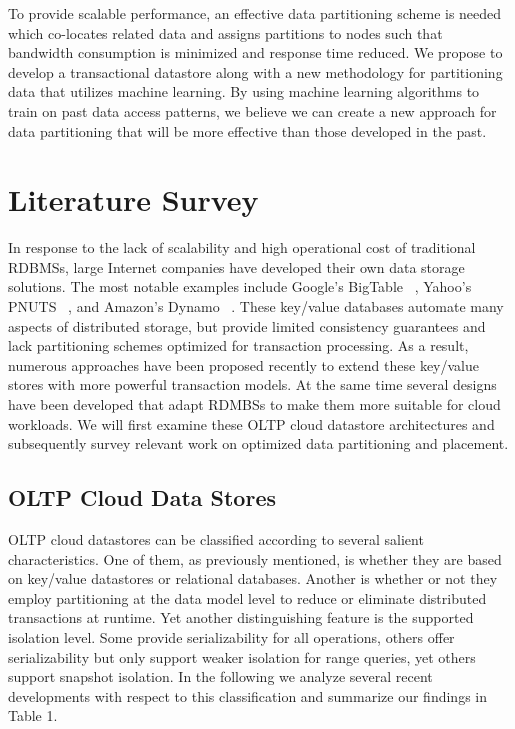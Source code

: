 \documentclass[10pt,final,journal]{IEEEtran}
\begin{document}
To provide scalable performance, an effective data partitioning scheme is needed which co-locates related data and assigns partitions to nodes such that bandwidth consumption is minimized and response time reduced. We propose to develop a transactional datastore along with a new methodology for partitioning data that utilizes machine learning. By using machine learning algorithms to train on past data access patterns, we believe we can create a new approach for data partitioning that will be more effective than those developed in the past.

\section{Literature Survey}
In response to the lack of scalability and high operational cost of traditional RDBMSs, large Internet companies have developed their own data storage solutions. The most notable examples include Google's BigTable ~\cite{Chang:2006:BDS:1267308.1267323}, Yahoo's PNUTS ~\cite{Cooper:2008:PYH:1454159.1454167}, and Amazon's Dynamo ~\cite{DeCandia:2007:DAH:1323293.1294281}. These key/value databases automate many aspects of distributed storage, but provide limited consistency guarantees and lack partitioning schemes optimized for transaction processing. As a result, numerous approaches have been proposed recently  to extend these key/value stores with more powerful transaction models. At the same time several designs have been developed that adapt RDMBSs to make them more suitable for cloud workloads. We will first examine these OLTP cloud datastore architectures and subsequently survey relevant work on optimized data partitioning and placement.

\subsection{OLTP Cloud Data Stores}
OLTP cloud datastores can be classified according to several salient characteristics. One of them, as previously mentioned, is whether they are based on key/value datastores or relational databases. Another is whether or not they employ partitioning at the data model level to reduce or eliminate distributed transactions at runtime. Yet another distinguishing feature is the supported isolation level. Some provide serializability for all operations, others offer serializability but only support weaker isolation for range queries, yet others support snapshot isolation. In the following we analyze several recent developments with respect to this classification and summarize our findings in Table 1.
\end{document}
